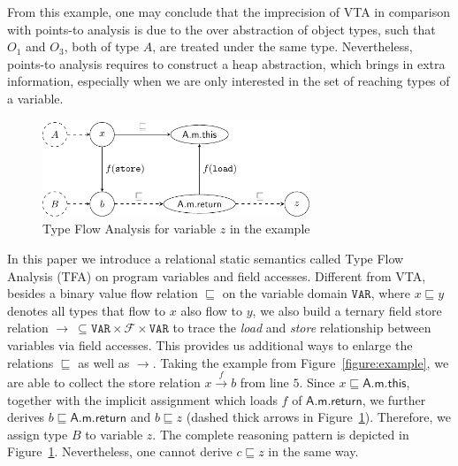 \documentclass{llncs}
\newcommand\Var{\mathtt{VAR}}
\newcommand{\Field}{\mathcal{F}}
\newcommand{\less}{\sqsubseteq}
\newcommand{\hflow}{\longrightarrow}
\newcommand{\lhflow}[1]{\stackrel{#1}{\hflow}}
\begin{document}
From this example, one may conclude that the imprecision of VTA in comparison with points-to analysis is due to the over abstraction of object types, such that $O_1$ and $O_3$, both of type $A$, are treated under the same type. Nevertheless, points-to analysis requires to construct a heap abstraction, which brings in extra information, especially when we are only interested in the set of reaching types of a variable.

\begin{figure}[t!]
\centering
\includegraphics[width=8cm]{tfa.pdf}
\caption{Type Flow Analysis for variable $z$ in the example}\label{fig:tfa}
\end{figure}

In this paper we introduce a relational static semantics called Type Flow Analysis (TFA) on program variables and field accesses. Different from VTA, besides a binary value flow relation $\less$ on the variable domain $\Var$, where $x\less y$ denotes all types that flow to $x$ also flow to $y$, we also build a ternary field store relation $\rightarrow\ \subseteq\Var\times\Field\times\Var$ to trace the \emph{load} and \emph{store} relationship between variables via field accesses. This provides us additional ways to enlarge the relations $\less$ as well as $\rightarrow$. %
Taking the example from Figure~\ref{figure:example}, we are able to collect the store relation $x\lhflow{f}b$ from line $5$. Since $x\less \textsf{A.m.this}$, together with the implicit assignment which loads $f$ of $\textsf{A.m.return}$, we further derives $b\less\textsf{A.m.return}$ and $b\less z$ (dashed thick arrows in Figure~\ref{fig:tfa}). Therefore, we assign type $B$ to variable $z$. The complete reasoning pattern is depicted in Figure~\ref{fig:tfa}. Nevertheless, one cannot derive $c\less z$ in the same way.
\end{document}
